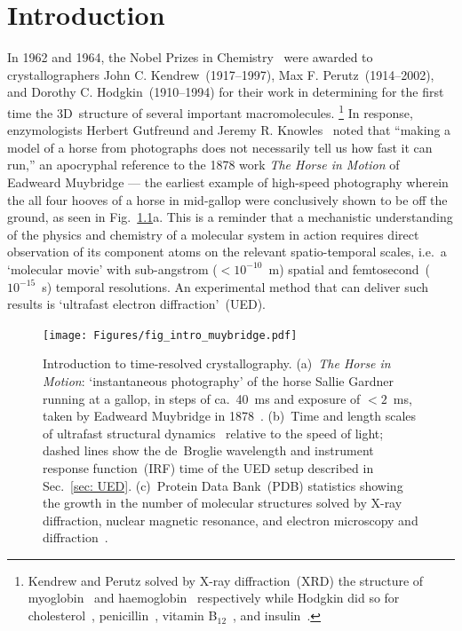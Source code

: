\chapter{Introduction}\label{ch: intro}

In 1962 and 1964, the Nobel Prizes in Chemistry~\cite{Nobel1964, Nobel1972}
were awarded to crystallographers John C. Kendrew~(1917--1997), Max F. Perutz~(1914--2002),
and Dorothy C. Hodgkin~(1910--1994) for their work in determining for the first time
the 3D~structure of several important macromolecules.%
\footnote{Kendrew and Perutz solved by X-ray diffraction~(XRD)
the structure of myoglobin~\cite{Kendrew1960} and haemoglobin~\cite{Perutz1960} respectively
while Hodgkin did so for cholesterol~\cite{Carlisle1945}, penicillin~\cite{Hodgkins1949},
vitamin B$_{12}$~\cite{Hodgkins1949}, and insulin~\cite{Hodgkins1949}.}
In response, enzymologists Herbert Gutfreund and Jeremy R. Knowles~\cite{Gutfreund1967} noted that
``making a model of a horse from photographs does not necessarily tell us how fast it can run,''
an apocryphal reference to the 1878 work \textit{The Horse in Motion} of Eadweard Muybridge ---
the earliest example of high-speed photography
wherein the all four hooves of a horse in mid-gallop were conclusively shown to be off the ground,
as seen in Fig.~\ref{fig: intro-muybridge}a.
%
This is a reminder that a mechanistic understanding of the physics and chemistry of a molecular system
in action requires direct observation of its component atoms on the relevant spatio-temporal scales,
i.e.~a `molecular movie' with sub-angstrom ($< 10^{-10}$~m) spatial
and femtosecond~($10^{-15}$~s) temporal resolutions.
%
An experimental method that can deliver such results is `ultrafast electron diffraction'~(UED).

\begin{figure}[ht!]
  \centering
  \texttt{[image: Figures/fig\_intro\_muybridge.pdf]}
  \caption[Introduction to time-resolved crystallography.]{
    Introduction to time-resolved crystallography.
    (a)~\textit{The Horse in Motion}: `instantaneous photography' of the horse Sallie Gardner
    running at a gallop, in steps of ca.~40~ms and exposure of $<2$~ms,
    taken by Eadweard Muybridge in 1878~\cite{Muybridge1878}.
    (b)~Time and length scales of ultrafast structural dynamics~\cite{Krausz2009, Hada2013,
    Ischenko2017} relative to the speed of light; dashed lines show the de~Broglie wavelength
    and instrument response function~(IRF) time of the UED setup described in Sec.~\ref{sec: UED}.
    (c)~Protein Data Bank~(PDB) statistics showing the growth in the number of molecular structures
    solved by X-ray diffraction, nuclear magnetic resonance, and electron microscopy
    and diffraction~\cite{PDB2000}.
  }
  \label{fig: intro-muybridge}
\end{figure}

